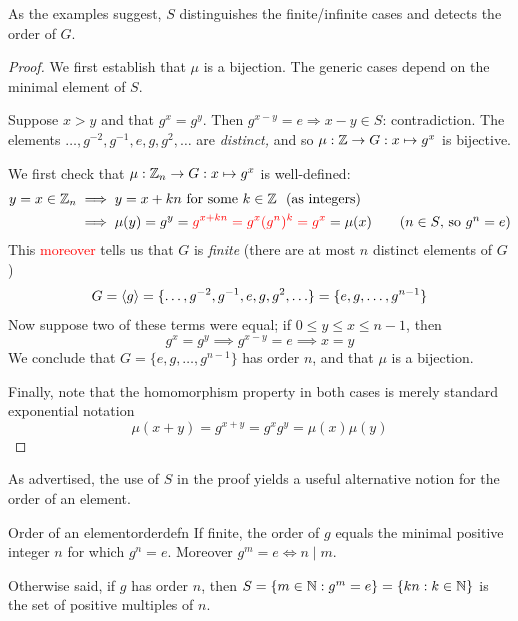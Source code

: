 As the examples suggest, $S$ distinguishes the finite/infinite cases and detects the order of $G$.


\goodbreak


\begin{proof}
	We first establish that $\mu$ is a bijection. The generic cases depend on the minimal element of $S$.
	\begin{description}\itemsep2pt
		\item[Case 1: $S=\emptyset$.]\quad Suppose $x>y$ and that $g^x=g^y$. Then $g^{x-y}=e\Longrightarrow x-y\in S$: contradiction. The elements $\ldots,g^{-2},g^{-1},e,g,g^2,\ldots$ are \emph{distinct,} and so $\mu:\mathbb{Z}\to G:x\mapsto g^x$ is bijective.
		\item[Case 2: $\min S=n$.]\quad We first check that $\mu:\mathbb{Z}_n\to G:x\mapsto g^x$ is well-defined:
		\begin{align*}
			y=x\in\mathbb{Z}_n&\implies y=x+kn\text{ for some $k\in\mathbb{Z}$ \ (as integers)}\\
			&\implies \mu(y) =g^y =\textcolor{red}{g^{x+kn}=g^x(g^n)^k =g^x} =\mu(x) \tag{$n\in S$, so $g^n=e$}
		\end{align*}
		This \textcolor{red}{moreover} tells us that $G$ is \emph{finite} (there are at most $n$ distinct elements of $G$)
		\[
			G=\left\langle g\right\rangle =\{\ldots,g^{-2},g^{-1},e,g,g^2,\ldots\} =\{e,g,\ldots,g^{n-1}\}
		\]
		Now suppose two of these terms were equal; if $0\le y\le x\le n-1$, then
		\[
			g^x=g^y\implies g^{x-y}=e\implies x=y \tag{$0\le x-y\le n-1<n=\min S$}
		\]
		We conclude that $G=\{e,g,\ldots,g^{n-1}\}$ has order $n$, and that $\mu$ is a bijection.
	\end{description}\medskip
	Finally, note that the homomorphism property in both cases is merely standard exponential notation
	\[
		\mu(x+y)=g^{x+y}=g^xg^y=\mu(x)\mu(y)\tag*{\qedhere}
	\]
\end{proof}

As advertised, the use of $S$ in the proof yields a useful alternative notion for the order of an element.

\begin{cor}{Order of an element}{orderdefn}
	If finite, the order of $g$ equals the minimal positive integer $n$ for which $g^n=e$. Moreover $g^m=e\Longleftrightarrow n\mid m$.
\end{cor}

Otherwise said, if $g$ has order $n$, then $S=\{m\in\mathbb{N}:g^m=e\}=\{kn:k\in\mathbb{N}\}$ is the set of positive multiples of $n$.



